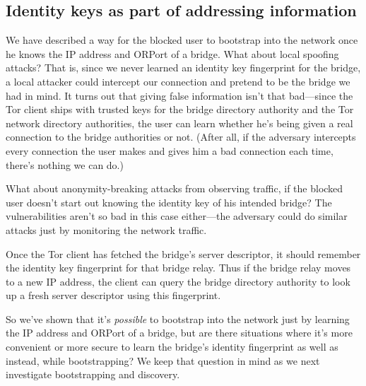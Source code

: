 \documentclass{llncs}
\begin{document}

\subsection{Identity keys as part of addressing information}

We have described a way for the blocked user to bootstrap into the
network once he knows the IP address and ORPort of a bridge. What about
local spoofing attacks? That is, since we never learned an identity
key fingerprint for the bridge, a local attacker could intercept our
connection and pretend to be the bridge we had in mind. It turns out
that giving false information isn't that bad---since the Tor client
ships with trusted keys for the bridge directory authority and the Tor
network directory authorities, the user can learn whether he's being
given a real connection to the bridge authorities or not. (After all,
if the adversary intercepts every connection the user makes and gives
him a bad connection each time, there's nothing we can do.)

What about anonymity-breaking attacks from observing traffic, if the
blocked user doesn't start out knowing the identity key of his intended
bridge? The vulnerabilities aren't so bad in this case either---the
adversary could do similar attacks just by monitoring the network
traffic.

Once the Tor client has fetched the bridge's server descriptor, it should
remember the identity key fingerprint for that bridge relay. Thus if
the bridge relay moves to a new IP address, the client can query the
bridge directory authority to look up a fresh server descriptor using
this fingerprint.

So we've shown that it's \emph{possible} to bootstrap into the network
just by learning the IP address and ORPort of a bridge, but are there
situations where it's more convenient or more secure to learn the bridge's
identity fingerprint as well as instead, while bootstrapping? We keep
that question in mind as we next investigate bootstrapping and discovery.
\end{document}
